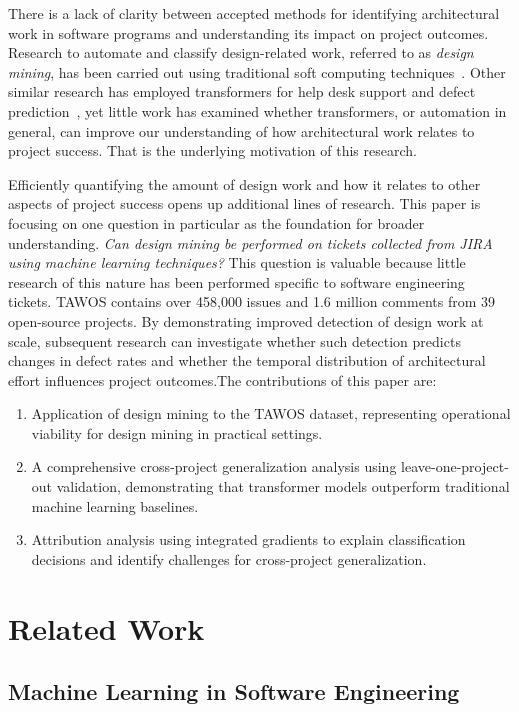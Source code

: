 \documentclass[preprint,12pt]{elsarticle}
\begin{document}
There is a lack of clarity between accepted methods for identifying architectural work in software programs and understanding its impact on project outcomes. Research to automate and classify design-related work, referred to as \emph{design mining}, has been carried out using traditional soft computing techniques~\cite{mahadi2021}. Other similar research has employed transformers for help desk support and defect prediction~\cite{incekas2024, zangari2023}, yet little work has examined whether transformers, or automation in general, can improve our understanding of how architectural work relates to project success. That is the underlying motivation of this research.

Efficiently quantifying the amount of design work and how it relates to other aspects of project success opens up additional lines of research. This paper is focusing on one question in particular as the foundation for broader understanding. \emph{Can design mining be performed on tickets collected from JIRA using machine learning techniques?} This question is valuable because little research of this nature has been performed specific to software engineering tickets.  TAWOS contains over 458,000 issues and 1.6 million comments from 39 open-source projects. By demonstrating improved detection of design work at scale, subsequent research can investigate whether such detection predicts changes in defect rates and whether the temporal distribution of architectural effort influences project outcomes.The contributions of this paper are:

\begin{enumerate}
\item Application of design mining to the TAWOS dataset, representing operational viability for design mining in practical settings.
\item A comprehensive cross-project generalization analysis using leave-one-project-out validation, demonstrating that transformer models outperform traditional machine learning baselines.
\item Attribution analysis using integrated gradients to explain classification decisions and identify challenges for cross-project generalization.
\end{enumerate}

\section{Related Work}

\subsection{Machine Learning in Software Engineering}
\end{document}
